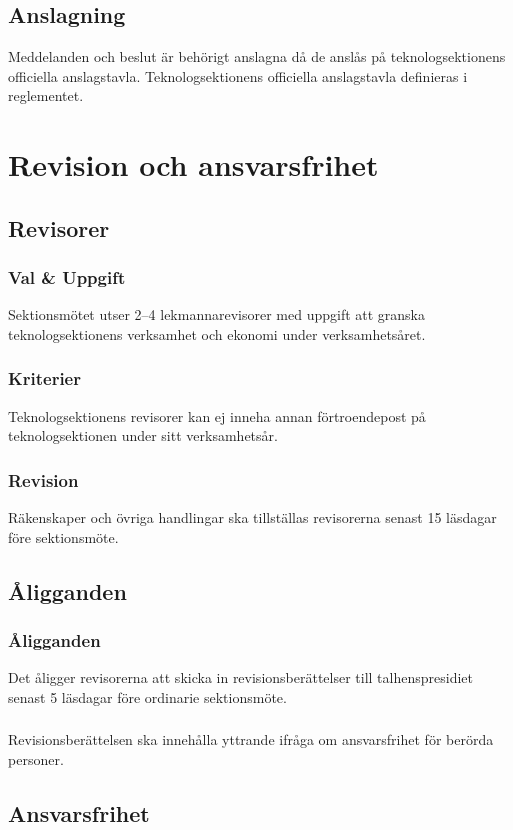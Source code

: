\documentclass[a4paper]{dtek}
\begin{document}
\subsection{Anslagning}
Meddelanden och beslut är behörigt anslagna då de anslås på teknologsektionens
officiella anslagstavla. Teknologsektionens officiella anslagstavla definieras i
reglementet.
\newpage

\section{Revision och ansvarsfrihet}
\subsection{Revisorer}
\subsubsection{Val \& Uppgift}
Sektionsmötet utser 2–4 lekmannarevisorer med uppgift att granska teknologsektionens verksamhet och ekonomi under verksamhetsåret.
\subsubsection{Kriterier}
Teknologsektionens revisorer kan ej inneha annan förtroendepost på teknologsektionen under sitt verksamhetsår.
\subsubsection{Revision}
Räkenskaper och övriga handlingar ska tillställas revisorerna senast 15 läsdagar före sektionsmöte.
\subsection{Åligganden}
\subsubsection{Åligganden}
Det åligger revisorerna att skicka in revisionsberättelser till talhenspresidiet senast 5 läsdagar före ordinarie sektionsmöte.
\subsubsection{}
Revisionsberättelsen ska innehålla yttrande ifråga om ansvarsfrihet för berörda personer.
\subsection{Ansvarsfrihet}
\end{document}
